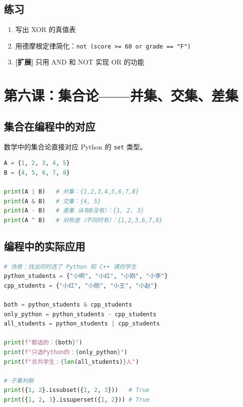 \documentclass[a4paper,12pt]{ctexart}
\begin{document}
\subsection*{练习}

\begin{enumerate}
  \item 写出 XOR 的真值表
  \item 用德摩根定律简化：\texttt{not (score >= 60 or grade == "F")}
  \item \textbf{[扩展]} 只用 AND 和 NOT 实现 OR 的功能
\end{enumerate}

\section*{第六课：集合论——并集、交集、差集}

\subsection*{集合在编程中的对应}

数学中的集合论直接对应 Python 的 \texttt{set} 类型。

\begin{lstlisting}[language=Python]
A = {1, 2, 3, 4, 5}
B = {4, 5, 6, 7, 8}

print(A | B)   # 并集：{1,2,3,4,5,6,7,8}
print(A & B)   # 交集：{4, 5}
print(A - B)   # 差集（A有B没有）：{1, 2, 3}
print(A ^ B)   # 对称差（不同时有）：{1,2,3,6,7,8}
\end{lstlisting}

\subsection*{编程中的实际应用}

\begin{lstlisting}[language=Python]
# 场景：找出同时选了 Python 和 C++ 课的学生
python_students = {"小明", "小红", "小刚", "小李"}
cpp_students = {"小红", "小刚", "小王", "小赵"}

both = python_students & cpp_students
only_python = python_students - cpp_students
all_students = python_students | cpp_students

print(f"都选的：{both}")
print(f"只选Python的：{only_python}")
print(f"总共学生：{len(all_students)}人")

# 子集判断
print({1, 2}.issubset({1, 2, 3}))   # True
print({1, 2, 3}.issuperset({1, 2})) # True
\end{lstlisting}
\end{document}
